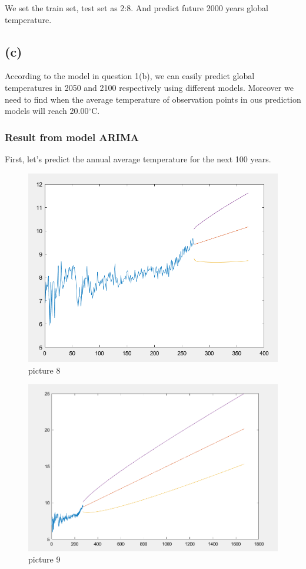 \documentclass{apmcmthesis}
\def\oc{$^{\circ}$C\;}
\begin{document}
We set the train set, test set as 2:8.
And predict future 2000 years global temperature.


\subsection{(c)}

According to the model in question 1(b), we can easily predict global temperatures in 2050 and 2100 respectively using different models. 
Moreover we need to find when the average temperature of observation points in ous prediction models will reach 20.00\oc.

\subsubsection{Result from model ARIMA}

First, let's predict the annual average temperature for the next 100 years.

\begin{figure}[htbp]
  \centering
  \includegraphics[scale=0.45]{ARIMA prediction 100.png}
  \caption{picture 8}
\end{figure}

\begin{figure}[htbp]
  \centering
  \includegraphics[scale=0.4]{ARIMA prediction 1400.png}
  \caption{picture 9}
\end{figure}
\end{document}
